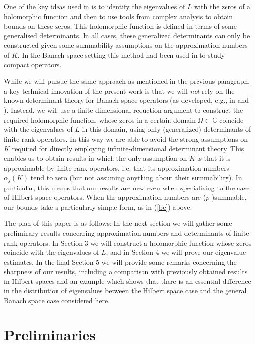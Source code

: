 \documentclass[12pt,a4paper]{article}
\theoremstyle{definition}
\theoremstyle{remark}
\numberwithin{equation}{section}
\newcommand{\mc}{{\mathbb C}}
\begin{document}
One of the key ideas used in \cite{MR2559715, demuth} is to identify the eigenvalues of $L$ with the zeros of a holomorphic function and then to use tools from complex analysis to obtain bounds on these zeros. This holomorphic function is defined in terms of some generalized determinants. 
In all cases, these generalized determinants can only be constructed given some summability assumptions on the approximation numbers of $K$. In the Banach space setting this method had been used in \cite{MR0298460} to study compact operators.

While we will pursue the same approach as mentioned in the previous paragraph, a key technical innovation of the present work is that we will {\it{not}} rely on the known determinant theory for Banach space operators (as developed, e.g., in \cite{pietsch} and \cite{MR568991}). Instead, we will use a finite-dimensional reduction argument to construct the required
holomorphic function, whose zeros in a certain domain $\Omega \subset \mc$ coincide with the eigenvalues of $L$ in this domain, using only (generalized) determinants of finite-rank operators. In this way we are able to avoid the strong assumptions on $K$ required for directly employing 
infinite-dimensional determinant theory. This enables us to obtain results in which the only assumption on $K$ is that it is approximable by finite rank operators, 
i.e. that its approximation numbers $\alpha_j(K)$ tend to zero (but not assuming anything about their summability). In particular, this means that our results are new even when specializing to the case of Hilbert space operators. 
When the approximation numbers are ($p$-)summable, our bounds take a particularly simple form, as in (\ref{be}) above.

The plan of this paper is as follows: In the next section we will gather some preliminary results concerning approximation numbers and determinants of finite rank operators. In Section 3 we will construct a holomorphic function whose zeros coincide with the eigenvalues of $L$, and in Section 4  we will prove our eigenvalue estimates. In the final Section 5 we will provide some remarks concerning the sharpness of our results, including a comparison with previously obtained results in Hilbert spaces and an example which shows 
that there is an essential difference in the distribution of eigenvalues between the Hilbert space case and the general Banach space case considered here. 

\section{Preliminaries} 
\end{document}
